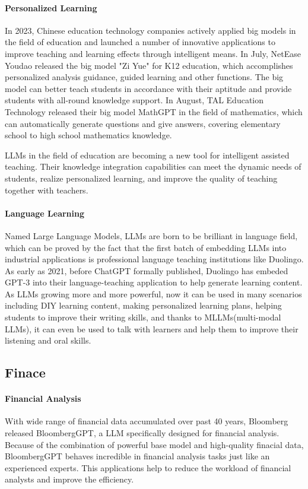 \documentclass[fleqn,10pt]{SelfArx} %
\begin{document}
\paragraph{Personalized Learning} In 2023, Chinese education technology companies actively applied big models in the field of education and launched a number of innovative applications to improve teaching and learning effects through intelligent means. In July, NetEase Youdao released the big model "Zi Yue" for K12 education, which accomplishes personalized analysis guidance, guided learning and other functions. The big model can better teach students in accordance with their aptitude and provide students with all-round knowledge support. In August, TAL Education Technology released their big model MathGPT in the field of mathematics, which can automatically generate questions and give answers, covering elementary school to high school mathematics knowledge. 

LLMs in the field of education are becoming a new tool for intelligent assisted teaching. Their knowledge integration capabilities can meet the dynamic needs of students, realize personalized learning, and improve the quality of teaching together with teachers.

\paragraph{Language Learning} Named Large Language Models, LLMs are born to be brilliant in language field, which can be proved by the fact that the first batch of embedding LLMs into industrial applications is professional language teaching institutions like Duolingo. As early as 2021, before ChatGPT formally published, Duolingo has embeded GPT-3 into their language-teaching application to help generate learning content. As LLMs growing more and more powerful, now it can be used in many scenarios including DIY learning content, making personalized learning plans, helping students to improve their writing skills, and thanks to MLLMs(multi-modal LLMs), it can even be used to talk with learners and help them to improve their listening and oral skills.

\subsection{Finace}


\paragraph{Financial Analysis} With wide range of financial data accumulated over past 40 years, Bloomberg released BloombergGPT, a LLM specifically designed for financial analysis. Because of the combination of powerful base model and high-quality finacial data, BloombergGPT behaves incredible in financial analysis tasks just like an experienced experts. This applications help to reduce the workload of financial analysts and improve the efficiency.
\end{document}
